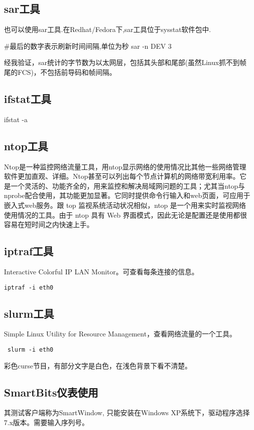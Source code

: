 \subsection{sar工具}
也可以使用sar工具.在Redhat/Fedora下,sar工具位于sysstat软件包中.
\begin{shellcmd}
#最后的数字表示刷新时间间隔,单位为秒
sar -n DEV 3 
\end{shellcmd}

经我验证，sar统计的字节数为以太网层，包括其头部和尾部(虽然Linux抓不到帧尾的FCS)，不包括前导码和帧间隔。

\subsection{ifstat工具}
\begin{shellcmd}
ifstat -a
\end{shellcmd}

\subsection{ntop工具}
Ntop是一种监控网络流量工具，用ntop显示网络的使用情况比其他一些网络管理软件更加直观、详细。Ntop甚至可以列出每个节点计算机的网络带宽利用率。它是一个灵活的、功能齐全的，用来监控和解决局域网问题的工具；尤其当ntop与nprobe配合使用，其功能更加显著。它同时提供命令行输入和web页面，可应用于嵌入式web服务。跟 top 监视系统活动状况相似，ntop 是一个用来实时监视网络使用情况的工具。由于 ntop 具有 Web 界面模式，因此无论是配置还是使用都很容易在短时间之内快速上手。

\subsection{iptraf工具}
Interactive Colorful IP LAN Monitor。可查看每条连接的信息。
\begin{verbatim}
iptraf -i eth0
\end{verbatim}


\subsection{slurm工具}
 Simple Linux Utility for Resource Management，查看网络流量的一个工具。
 \begin{verbatim}
 slurm -i eth0
 \end{verbatim}

彩色curse节目，有部分文字是白色，在浅色背景下看不清楚。




\subsection{SmartBits仪表使用}
其测试客户端称为SmartWindow, 只能安装在Windows XP系统下，驱动程序选择7.x版本。需要输入序列号。

